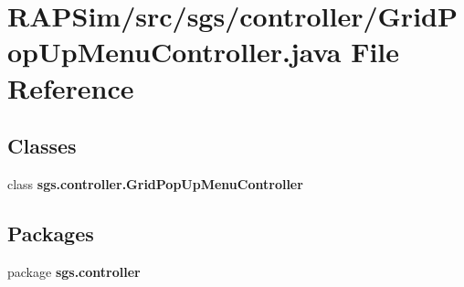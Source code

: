 \section{R\-A\-P\-Sim/src/sgs/controller/\-Grid\-Pop\-Up\-Menu\-Controller.java File Reference}
\label{_grid_pop_up_menu_controller_8java}
\subsection*{Classes}
\begin{DoxyCompactItemize}
\item 
class {\bf sgs.\-controller.\-Grid\-Pop\-Up\-Menu\-Controller}
\end{DoxyCompactItemize}
\subsection*{Packages}
\begin{DoxyCompactItemize}
\item 
package {\bf sgs.\-controller}
\end{DoxyCompactItemize}
